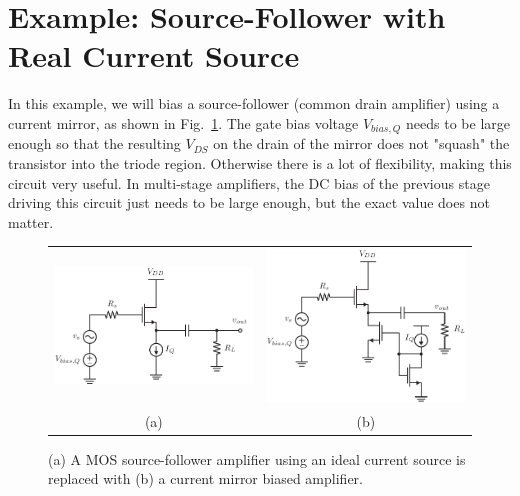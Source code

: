 \section{Example:  Source-Follower with Real Current Source}
In this example, we will bias a source-follower (common drain amplifier) using a current mirror, as shown in Fig.~\ref{fig:cd_amp_dc}.  The gate bias voltage $V_{bias,Q}$ needs to be large enough so that the resulting $V_{DS}$ on the drain of the mirror does not "squash" the transistor into the triode region.  Otherwise there is a lot of flexibility, making this circuit very useful.  In multi-stage amplifiers, the DC bias of the previous stage driving this circuit just needs to be large enough, but the exact value does not matter.
\begin{figure}[tb]
\centering
\begin{tabular}{cc}
\includegraphics[scale=.8]{cd_amp_dc} &
\includegraphics[scale=.8]{cd_amp_dc_mirror}\\
(a) & (b)\\
\end{tabular}
\caption{(a) A MOS source-follower amplifier using an ideal current source is replaced with (b) a current mirror biased amplifier.}
\label{fig:cd_amp_dc}
\end{figure}

